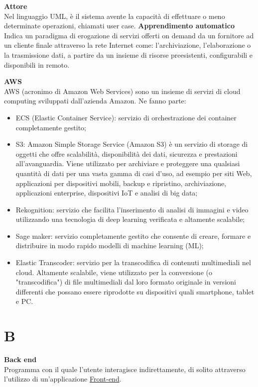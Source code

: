 \documentclass[a4paper, oneside, openany, dvipsnames, table, 12pt]{article}
\begin{document}
\textbf{Attore} \\
Nel linguaggio UML, è il sistema avente la capacità di effettuare o meno determinate operazioni, chiamati user case.
\label{par:appr_auto}
\textbf{Apprendimento automatico} \\ 
Indica un paradigma di erogazione di servizi offerti on demand da un fornitore ad un cliente finale attraverso la rete Internet come: l'archiviazione, l'elaborazione o la trasmissione dati, a partire da un insieme di risorse preesistenti, configurabili e disponibili in remoto.

\textbf{AWS} \\
AWS (acronimo di Amazon Web Services) sono un insieme di servizi di cloud computing sviluppati dall'azienda Amazon. Ne fanno parte: 
\begin{itemize}
\item ECS (Elastic Container Service): servizio di orchestrazione dei container completamente gestito;
\item S3: Amazon Simple Storage Service (Amazon S3) è un servizio di storage di oggetti che offre scalabilità, disponibilità dei dati, sicurezza e prestazioni all'avanguardia. Viene utilizzato per archiviare e proteggere una qualsiasi quantità di dati per una vasta gamma di casi d'uso, ad esempio per siti Web, applicazioni per dispositivi mobili, backup e ripristino, archiviazione, applicazioni enterprise, dispositivi IoT e analisi di big data;
\item Rekognition: servizio che facilita l'inserimento di analisi di immagini e video utilizzando una tecnologia di deep learning verificata e altamente scalabile;
\item Sage maker: servizio completamente gestito che consente di creare, formare e distribuire in modo rapido modelli di machine learning (ML);
\item Elastic Transcoder: servizio per la transcodifica di contenuti multimediali nel cloud. Altamente scalabile, viene utilizzato per la conversione (o "transcodifica") di file multimediali dal loro formato originale in versioni differenti che possano essere riprodotte su dispositivi quali smartphone, tablet e PC.
\end{itemize}

\newpage
\section{B}
\textbf{Back end} \\
Programma con il quale l’utente interagisce indirettamente, di solito attraverso l’utilizzo di un’applicazione \hyperref[par:frontend]{Front-end}.
\end{document}
